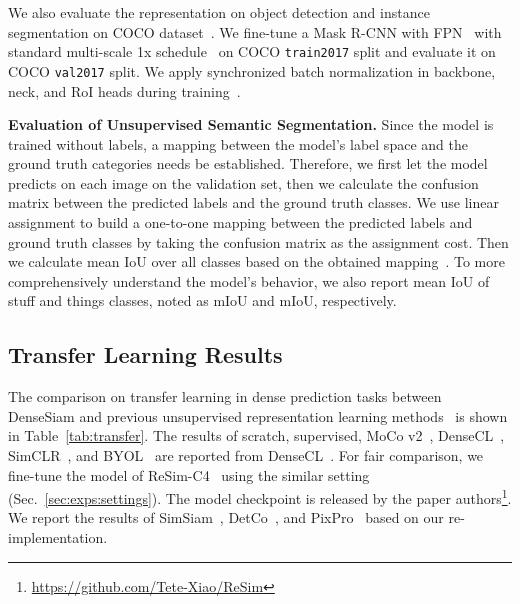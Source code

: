 \documentclass[runningheads]{llncs}
\newcommand{\myparagraph}[1]{{\noindent\bf #1}}
\newcommand{\things}{\tss{Th}\xspace}
\newcommand{\stuff}{\tss{St}\xspace}
\begin{document}
We also evaluate the representation on object detection and instance segmentation on COCO dataset~\cite{coco}.
We fine-tune a Mask R-CNN with FPN~\cite{fpn} with standard multi-scale 1x schedule~\cite{mmdetection, wu2019detectron2} on COCO \texttt{train2017} split
and evaluate it on COCO \texttt{val2017} split.
We apply synchronized batch normalization in backbone, neck, and RoI heads during training~\cite{scratch, densecl}.

\myparagraph{Evaluation of Unsupervised Semantic Segmentation.}
Since the model is trained without labels, a mapping between the model's label space and the ground truth categories needs be established.
Therefore, we first let the model predicts on each image on the validation set, then we calculate the confusion matrix between the predicted labels and the ground truth classes.
We use linear assignment to build a one-to-one mapping between the predicted labels and ground truth classes by taking the confusion matrix as the assignment cost.
Then we calculate mean IoU over all classes based on the obtained mapping~\cite{picie, iic}.
To more comprehensively understand the model's behavior, we also report mean IoU of stuff and things classes, noted as mIoU\stuff and mIoU\things, respectively.

\subsection{Transfer Learning Results}
The comparison on transfer learning in dense prediction tasks between DenseSiam and previous unsupervised representation learning methods~\cite{moco, byol, simclr, densecl, resim, simsiam} is shown in Table~\ref{tab:transfer}.
The results of scratch, supervised, MoCo v2~\cite{mocov2}, DenseCL~\cite{densecl}, SimCLR~\cite{simclr}, and BYOL~\cite{byol} are reported from DenseCL~\cite{densecl}.
For fair comparison, we fine-tune the model of ReSim-C4~\cite{resim} using the similar setting (Sec.~\ref{sec:exps:settings}).
The model checkpoint is released by the paper authors\footnote{\url{https://github.com/Tete-Xiao/ReSim}}.
We report the results of SimSiam~\cite{simsiam}, DetCo~\cite{detco}, and PixPro~\cite{pixpro} based on our re-implementation.
\end{document}
